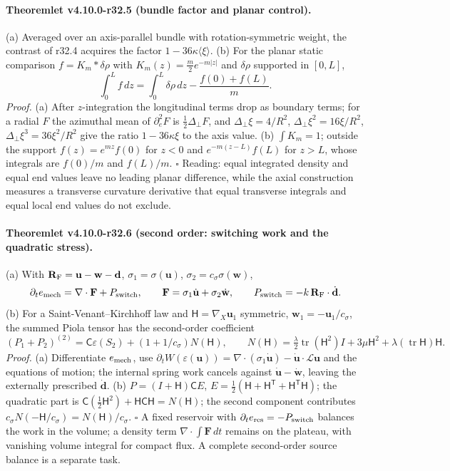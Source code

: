 \paragraph{Theoremlet v4.10.0-r32.5 (bundle factor and planar control).}
(a) Averaged over an axis-parallel bundle with rotation-symmetric weight, the contrast of r32.4 acquires the factor \(1-36\kappa\langle\xi\rangle\).
(b) For the planar static comparison \(f=K_m*\delta\rho\) with \(K_m(z)=\tfrac m2e^{-m|z|}\) and \(\delta\rho\) supported in \([0,L]\),
\[
 \int_0^Lf\,dz=\int_0^L\delta\rho\,dz-\frac{f(0)+f(L)}{m}.
\]
\emph{Proof.} (a) After \(z\)-integration the longitudinal terms drop as boundary terms; for a radial \(F\) the azimuthal mean of \(\partial_e^2F\) is
\(\tfrac12\Delta_\perp F\), and \(\Delta_\perp\xi=4/R^2\), \(\Delta_\perp\xi^2=16\xi/R^2\), \(\Delta_\perp\xi^3=36\xi^2/R^2\) give the ratio \(1-36\kappa\xi\) to the axis
value.  (b) \(\int K_m=1\); outside the support \(f(z)=e^{mz}f(0)\) for \(z<0\) and \(e^{-m(z-L)}f(L)\) for \(z>L\), whose integrals are \(f(0)/m\) and
\(f(L)/m\).  \(\square\)
Reading: equal integrated density and equal end values leave no leading planar difference, while the axial construction measures a
transverse curvature derivative that equal transverse integrals and equal local end values do not exclude.

\paragraph{Theoremlet v4.10.0-r32.6 (second order: switching work and the quadratic stress).}
(a) With \(\mathbf R_{\rm F}=\mathbf u-\mathbf w-\mathbf d\), \(\sigma_1=\sigma(\mathbf u)\), \(\sigma_2=c_\sigma\sigma(\mathbf w)\),
\[
 \partial_te_{\rm mech}=\nabla\cdot\mathbf F+P_{\rm switch},\qquad \mathbf F=\sigma_1\dot{\mathbf u}+\sigma_2\dot{\mathbf w},\qquad
 P_{\rm switch}=-k\,\mathbf R_{\rm F}\cdot\dot{\mathbf d}.
\]
(b) For a Saint-Venant--Kirchhoff law and \(\mathsf H=\nabla_X\mathbf u_1\) symmetric, \(\mathbf w_1=-\mathbf u_1/c_\sigma\), the summed Piola tensor has the
second-order coefficient
\[
 (P_1+P_2)^{(2)}=\mathsf C\varepsilon(S_2)+(1+1/c_\sigma)N(\mathsf H),\qquad
 N(\mathsf H)=\tfrac\lambda2\operatorname{tr}(\mathsf H^2)I+3\mu\mathsf H^2+\lambda(\operatorname{tr}\mathsf H)\mathsf H .
\]
\emph{Proof.} (a) Differentiate \(e_{\rm mech}\), use \(\partial_tW(\varepsilon(\mathbf u))=\nabla\cdot(\sigma_1\dot{\mathbf u})-\dot{\mathbf u}\cdot\mathcal L\mathbf u\) and the
equations of motion; the internal spring work cancels against \(\dot{\mathbf u}-\dot{\mathbf w}\), leaving the externally prescribed \(\dot{\mathbf d}\).
(b) \(P=(I+\mathsf H)\mathsf C E\), \(E=\tfrac12(\mathsf H+\mathsf H^{\mathsf T}+\mathsf H^{\mathsf T}\mathsf H)\); the quadratic part is
\(\mathsf C(\tfrac12\mathsf H^2)+\mathsf H\mathsf C\mathsf H=N(\mathsf H)\); the second component contributes \(c_\sigma N(-\mathsf H/c_\sigma)=N(\mathsf H)/c_\sigma\).  \(\square\)
A fixed reservoir with \(\partial_te_{\rm res}=-P_{\rm switch}\) balances the work in the volume; a density term \(\nabla\cdot\int\mathbf F\,dt\) remains on
the plateau, with vanishing volume integral for compact flux.  A complete second-order source balance is a separate task.

